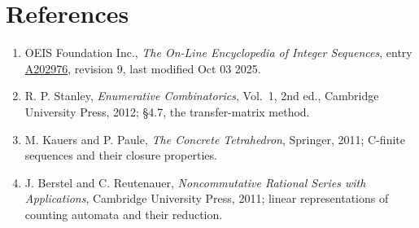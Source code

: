 \documentclass[11pt]{article}
\theoremstyle{definition}
\begin{document}
\section{References}

\begin{enumerate}

\item OEIS Foundation Inc., \emph{The On-Line Encyclopedia of Integer Sequences}, entry \href{https://oeis.org/A202976}{A202976}, revision 9, last modified Oct 03 2025.

\item R. P. Stanley, \emph{Enumerative Combinatorics}, Vol.~1, 2nd ed., Cambridge University Press, 2012; \S4.7, the transfer-matrix method.

\item M. Kauers and P. Paule, \emph{The Concrete Tetrahedron}, Springer, 2011; C-finite sequences and their closure properties.

\item J. Berstel and C. Reutenauer, \emph{Noncommutative Rational Series with Applications}, Cambridge University Press, 2011; linear representations of counting automata and their reduction.

\end{enumerate}
\end{document}
